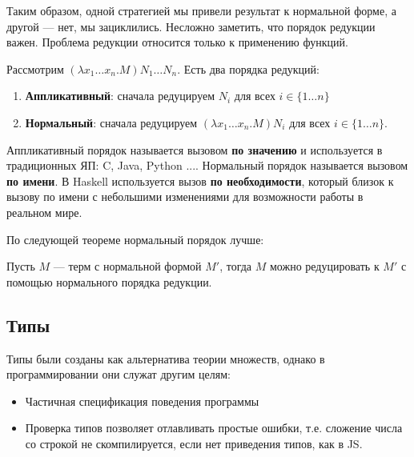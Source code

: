 Таким образом, одной стратегией мы привели результат к нормальной форме, а другой --- нет, мы зациклились. Несложно заметить, что порядок редукции важен. Проблема редукции относится только к применению функций.

Рассмотрим \((\lambda x_1\dots x_n.M)N_1 \dots N_n\). Есть два порядка редукций:
\begin{enumerate}
    \item \textbf{Аппликативный}: сначала редуцируем \(N_i\) для всех \(i \in \{1 \dots n\}\)
    \item \textbf{Нормальный}: сначала редуцируем \((\lambda x_1 \dots x_n.M)N_i\) для всех \(i \in \{1 \dots n\}\).
\end{enumerate}

Аппликативный порядок называется вызовом \textbf{по значению} и используется в традиционных ЯП: C, Java, Python .... Нормальный порядок называется вызовом \textbf{по имени}. В Haskell используется вызов \textbf{по необходимости}, который близок к вызову по имени с небольшими изменениями для возможности работы в реальном мире.

По следующей теореме нормальный порядок лучше:
\begin{theorem}
    Пусть \(M\) --- терм с нормальной формой \(M'\), тогда \(M\) можно редуцировать к \(M'\) с помощью нормального порядка редукции.
\end{theorem}

\subsection{Типы}

Типы были созданы как альтернатива теории множеств, однако в программировании они служат другим целям:
\begin{itemize}
    \item Частичная спецификация поведения программы
    \item Проверка типов позволяет отлавливать простые ошибки, т.е. сложение числа со строкой не скомпилируется, если нет приведения типов, как в JS.
\end{itemize}

